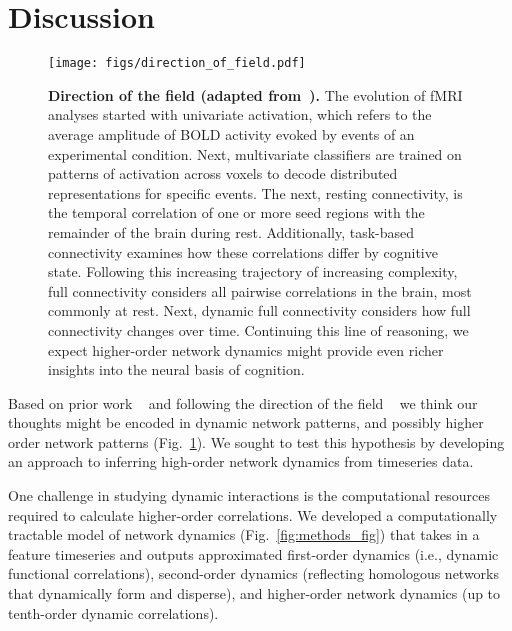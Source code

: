 \documentclass[english]{article}
\begin{document}
\section*{Discussion}

\begin{figure}
  \centering
  \texttt{[image: figs/direction\_of\_field.pdf]}
  \caption{\textbf{Direction of the field (adapted from~\citep{Turk13}).} The evolution of fMRI analyses started with
    univariate activation, which refers to
    the average amplitude of BOLD activity evoked by events of an
    experimental condition. Next, multivariate classifiers are trained
    on patterns of activation across voxels to decode distributed
    representations for specific events. The next, resting
    connectivity, is the temporal correlation of one or more seed
    regions with the remainder of the brain during rest. Additionally,
    task-based connectivity examines how these correlations differ by
    cognitive state. Following this increasing trajectory of
    increasing complexity, full connectivity considers all pairwise
    correlations in the brain, most commonly at rest.  Next, dynamic
    full connectivity considers how full connectivity changes over
    time. Continuing this line of reasoning, we expect higher-order network dynamics might provide even richer insights into the neural basis of cognition.}
  \label{fig:direction_of_field}
\end{figure}



Based on prior work ~\citep{Deme19} and following the direction of the field ~\citep{Turk13} we think our thoughts might be encoded in
dynamic network patterns, and possibly higher order network
patterns (Fig.~\ref{fig:direction_of_field}). We sought to test this hypothesis by developing an approach
to inferring high-order network dynamics from timeseries data. 

One challenge in studying dynamic interactions is the
computational resources required to calculate higher-order correlations. 
We developed a computationally tractable model of network dynamics (Fig.~\ref{fig:methods_fig}) that takes in a feature
timeseries and outputs approximated first-order dynamics (i.e.,
dynamic functional correlations), second-order dynamics
(reflecting homologous networks that dynamically form and disperse),
and higher-order network dynamics (up to tenth-order dynamic
correlations).
\end{document}
